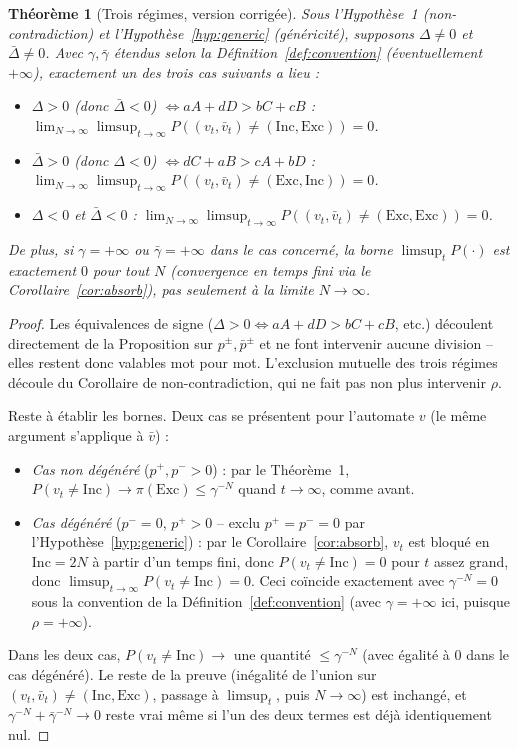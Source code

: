 \documentclass[11pt]{article}
\newtheorem{theorem}{Théorème}
\theoremstyle{remark}
\newcommand{\Inc}{\ensuremath{\mathrm{Inc}}}
\newcommand{\Exc}{\ensuremath{\mathrm{Exc}}}
\newcommand{\vbar}{\bar{v}}
\begin{document}
\begin{theorem}[Trois régimes, version corrigée]\label{thm:sel}
Sous l'Hypothèse~1 (non-contradiction) et l'Hypothèse~\ref{hyp:generic}
(généricité), supposons $\Delta\ne0$ et $\bar\Delta\ne0$. Avec $\gamma,\bar\gamma$
étendus selon la Définition~\ref{def:convention} (éventuellement $+\infty$),
exactement un des trois cas suivants a lieu :
\begin{itemize}
\item $\Delta>0$ (donc $\bar\Delta<0$) $\iff aA+dD>bC+cB$ :
$\lim_{N\to\infty}\limsup_{t\to\infty}P((v_t,\vbar_t)\ne(\Inc,\Exc))=0$.
\item $\bar\Delta>0$ (donc $\Delta<0$) $\iff dC+aB>cA+bD$ :
$\lim_{N\to\infty}\limsup_{t\to\infty}P((v_t,\vbar_t)\ne(\Exc,\Inc))=0$.
\item $\Delta<0$ et $\bar\Delta<0$ :
$\lim_{N\to\infty}\limsup_{t\to\infty}P((v_t,\vbar_t)\ne(\Exc,\Exc))=0$.
\end{itemize}
De plus, si $\gamma=+\infty$ ou $\bar\gamma=+\infty$ dans le cas concerné, la
borne $\limsup_t P(\cdot)$ est exactement $0$ pour tout $N$ (convergence en
temps fini via le Corollaire~\ref{cor:absorb}), pas seulement à la limite
$N\to\infty$.
\end{theorem}

\begin{proof}
Les équivalences de signe ($\Delta>0\iff aA+dD>bC+cB$, etc.) découlent
directement de la Proposition sur $p^\pm,\bar p^\pm$ et ne font intervenir
aucune division -- elles restent donc valables mot pour mot. L'exclusion
mutuelle des trois régimes découle du Corollaire de non-contradiction, qui
ne fait pas non plus intervenir $\rho$.

Reste à établir les bornes. Deux cas se présentent pour l'automate $v$ (le
même argument s'applique à $\vbar$) :
\begin{itemize}
\item \emph{Cas non dégénéré} ($p^+,p^->0$) : par le Théorème~1,
$P(v_t\ne\Inc)\to\pi(\Exc)\le\gamma^{-N}$ quand $t\to\infty$, comme avant.
\item \emph{Cas dégénéré} ($p^-=0$, $p^+>0$ -- exclu $p^+=p^-=0$ par
l'Hypothèse~\ref{hyp:generic}) : par le Corollaire~\ref{cor:absorb}, $v_t$
est bloqué en $\Inc=2N$ à partir d'un temps fini, donc $P(v_t\ne\Inc)=0$
pour $t$ assez grand, donc $\limsup_{t\to\infty}P(v_t\ne\Inc)=0$. Ceci
coïncide exactement avec $\gamma^{-N}=0$ sous la convention de la
Définition~\ref{def:convention} (avec $\gamma=+\infty$ ici, puisque
$\rho=+\infty$).
\end{itemize}
Dans les deux cas, $P(v_t\ne\Inc)\to$ une quantité $\le\gamma^{-N}$ (avec
égalité à $0$ dans le cas dégénéré). Le reste de la preuve (inégalité de
l'union sur $(v_t,\vbar_t)\ne(\Inc,\Exc)$, passage à $\limsup_t$, puis
$N\to\infty$) est inchangé, et $\gamma^{-N}+\bar\gamma^{-N}\to0$ reste vrai
même si l'un des deux termes est déjà identiquement nul.
\end{proof}
\end{document}
